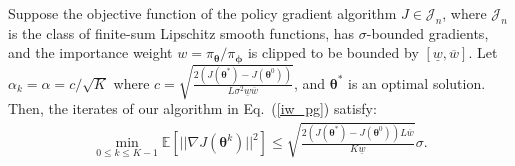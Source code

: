 \setcounter{theorem}{0}
\begin{theorem}\label{thm:con_app}
Suppose the objective function of the policy gradient algorithm $J\in\mathcal{J}_n$, where $\mathcal{J}_n$ is the class of finite-sum Lipschitz smooth functions, has $\sigma$-bounded gradients, and the importance weight $w=\pi_{\bm{\theta}}/\pi_{\bm{\phi}}$ is clipped to be bounded by $[\underline{w}, \overline{w}]$.
Let $\alpha_k=\alpha=c/\sqrt{K}$ where $c = \sqrt{\frac{2(J(\bm{\theta}^*)-J(\bm{\theta}^0))}{L\sigma^2\underline{w}\overline{w}}}$, and $\bm{\theta}^*$ is an optimal solution. 
Then, the iterates of our algorithm in Eq.~(\ref{iw_pg}) satisfy:
\begin{eqnarray}
\min_{0\le k\le K-1}\mathbb{E}[||\nabla J(\bm{\theta}^k)||^2] \le \sqrt{\frac{2(J(\bm{\theta}^*)-J(\bm{\theta}^0))L\overline{w}}{K\underline{w}}}\sigma. \nonumber
\end{eqnarray}
\end{theorem}

